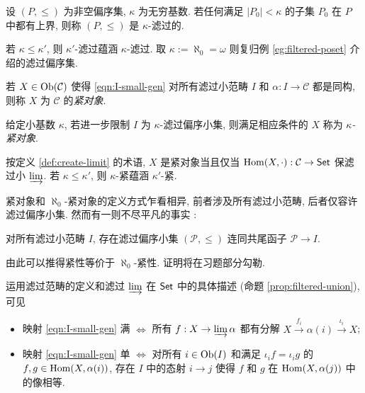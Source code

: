 \begin{definition}\label{def:kappa-filtered}
	设 $(P, \leq)$ 为非空偏序集, $\kappa$ 为无穷基数. 若任何满足 $|P_0| < \kappa$ 的子集 $P_0$ 在 $P$ 中都有上界, 则称 $(P, \leq)$ 是 $\kappa$-滤过的.
\end{definition}

若 $\kappa \leq \kappa'$, 则 $\kappa'$-滤过蕴涵 $\kappa$-滤过. 取 $\kappa := \aleph_0 = \omega$ 则复归例 \ref{eg:filtered-poset} 介绍的滤过偏序集.

\begin{definition}\label{def:cpt-objects}
	若 $X \in \operatorname{Ob}(\mathcal{C})$ 使得 \eqref{eqn:I-small-gen} 对所有滤过小范畴 $I$ 和 $\alpha: I \to \mathcal{C}$ 都是同构, 则称 $X$ 为 $\mathcal{C}$ 的\emph{紧对象}.
	
	给定小基数 $\kappa$, 若进一步限制 $I$ 为 $\kappa$-滤过偏序小集, 则满足相应条件的 $X$ 称为 \emph{$\kappa$-紧对象}.
\end{definition}

按定义 \ref{def:create-limit} 的术语, $X$ 是紧对象当且仅当 $\operatorname{Hom}(X, \cdot): \mathcal{C} \to \mathsf{Set}$ 保滤过小 $\varinjlim$. 若 $\kappa \leq \kappa'$, 则 $\kappa$-紧蕴涵 $\kappa'$-紧.

\begin{remark}\label{rem:filtered-poset}
	紧对象和 $\aleph_0$-紧对象的定义方式乍看相异, 前者涉及所有滤过小范畴, 后者仅容许滤过偏序小集. 然而有一则不尽平凡的事实 \cite[Theorem 1.5]{AR94}:
	\begin{center}\begin{minipage}{0.7\textwidth}
		对所有滤过小范畴 $I$, 存在滤过偏序小集 $(\mathcal{P}, \leq)$ 连同共尾函子 $\mathcal{P} \to I$.
	\end{minipage}\end{center}
	由此可以推得紧性等价于 $\aleph_0$-紧性. 证明将在习题部分勾勒.
\end{remark}

运用滤过范畴的定义和滤过 $\varinjlim$ 在 $\mathsf{Set}$ 中的具体描述 (命题 \ref{prop:filtered-union}), 可见
\begin{itemize}
	\item 映射 \eqref{eqn:I-small-gen} 满 $\iff$ 所有 $f: X \to \varinjlim \alpha$ 都有分解 $X \xrightarrow{f_i} \alpha(i) \xrightarrow{\iota_i} X$;
	\item 映射 \eqref{eqn:I-small-gen} 单 $\iff$ 对所有 $i \in \operatorname{Ob}(I)$ 和满足 $\iota_i f = \iota_i g$ 的 $f, g \in \operatorname{Hom}(X, \alpha(i))$, 存在 $I$ 中的态射 $i \to j$ 使得 $f$ 和 $g$ 在 $\operatorname{Hom}(X, \alpha(j))$ 中的像相等.
\end{itemize}


